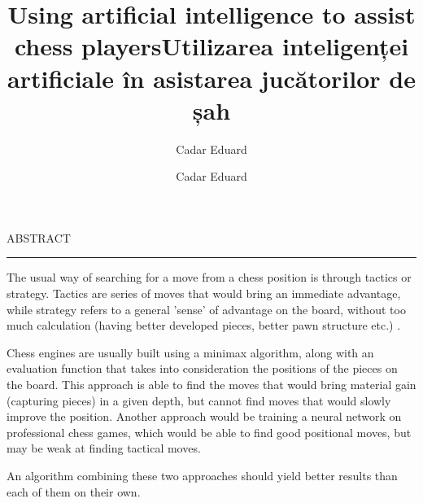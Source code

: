 \documentclass[12pt]{report}
\begin{document}
\title{Using artificial intelligence to assist chess players}
\author{Cadar Eduard}
\maketitle

\title{Utilizarea inteligenței artificiale în asistarea jucătorilor de șah}
\author{Cadar Eduard}
\maketitle

\newpage
\thispagestyle{empty}
\mbox{}
\newpage
{} 

\cleardoublepage
ABSTRACT
\vspace{0.5cm}	
\hrule
\vspace{0.5cm}	

The usual way of searching for a move from a chess position is through tactics or strategy. Tactics are series of moves that would bring an immediate advantage, while strategy refers to a general 'sense' of advantage on the board, without too much calculation (having better developed pieces, better pawn structure etc.) \cite{klein2022neural}.

Chess engines are usually built using a minimax algorithm, along with an evaluation function that takes into consideration the positions of the pieces on the board. This approach is able to find the moves that would bring material gain (capturing pieces) in a given depth, but cannot find moves that would slowly improve the position. Another approach would be training a neural network on professional chess games, which would be able to find good positional moves, but may be weak at finding tactical moves.

An algorithm combining these two approaches should yield better results than each of them on their own.

\tableofcontents
\newpage
\listoffigures
{}











\end{document}
